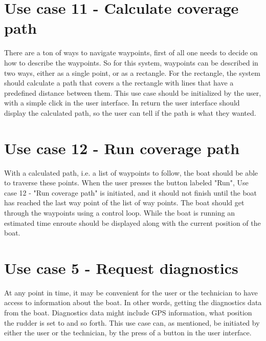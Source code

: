 \section{Use case 11 - Calculate coverage path}
There are a ton of ways to navigate waypoints, first of all one needs to decide on how to describe the waypoints. So for this system, waypoints can be described in two ways, either as a single point, or as a rectangle. For the rectangle, the system should calculate a path that covers a the rectangle with lines that have a predefined distance between them. This use case should be initialized by the user, with a simple click in the user interface. In return the user interface should display the calculated path, so the user can tell if the path is what they wanted.

\section{Use case 12 - Run coverage path}
With a calculated path, i.e. a list of waypoints to follow, the boat should be able to traverse these points. When the user presses the button labeled "Run", Use case 12 - "Run coverage path" is initiated, and it should not finish until the boat has reached the last way point of the list of way points. The boat should get through the waypoints using a control loop. While the boat is running an estimated time enroute should be displayed along with the current position of the boat.

\section{Use case 5 - Request diagnostics}
At any point in time, it may be convenient for the user or the technician to have access to information about the boat. In other words, getting the diagnostics data from the boat. Diagnostics data might include GPS information, what position the rudder is set to and so forth. This use case can, as mentioned, be initiated by either the user or the technician, by the press of a button in the user interface. 



